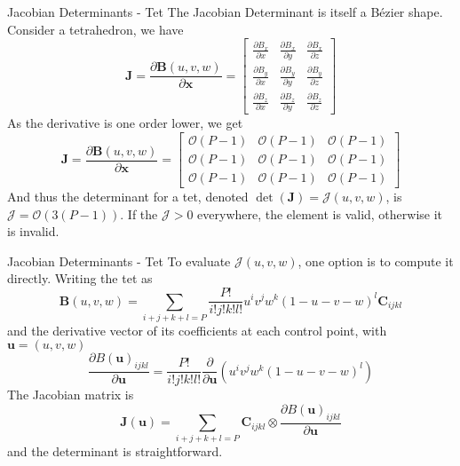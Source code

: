 \documentclass[12pt]{beamer}
\begin{document}
\begin{frame}{Jacobian Determinants - Tet}
The Jacobian Determinant is itself a B{\'e}zier shape. Consider a tetrahedron, we have
\[
\mathbf{J} = \frac{\partial \mathbf{B}(u,v,w)}{\partial \mathbf{x}} = 
\left[\begin{array}{ccc} \frac{\partial B_x}{\partial x} & \frac{\partial B_x}{\partial y} & \frac{\partial B_x}{\partial z} \\
\frac{\partial B_y}{\partial x} & \frac{\partial B_y}{\partial y} & \frac{\partial B_y}{\partial z} \\
\frac{\partial B_z}{\partial x} & \frac{\partial B_z}{\partial y} & \frac{\partial B_z}{\partial z} \end{array} \right]
\]
As the derivative is one order lower, we get
\[
\mathbf{J} = \frac{\partial \mathbf{B}(u,v,w)}{\partial \mathbf{x}} = 
\left[\begin{array}{ccc} \mathcal{O}(P-1) & \mathcal{O}(P-1) & \mathcal{O}(P-1) \\ \mathcal{O}(P-1) & \mathcal{O}(P-1) & \mathcal{O}(P-1) \\ \mathcal{O}(P-1) & \mathcal{O}(P-1) & \mathcal{O}(P-1)\end{array} \right]
\]
And thus the determinant for a tet, denoted $\det(\mathbf{J}) = \mathcal{J}(u,v,w)$, is $\mathcal{J} = \mathcal{O}(3(P-1))$. If the $\mathcal{J} > 0$ everywhere, the element is valid, otherwise it is invalid.
\end{frame}
\begin{frame}{Jacobian Determinants - Tet}
To evaluate $\mathcal{J}(u,v,w)$, one option is to compute it directly. Writing the tet as
 \[ \mathbf{B}(u,v,w) = \displaystyle\sum_{i+j+k+l=P} \frac{P!}{i!j!k!l!}u^iv^jw^k(1-u-v-w)^l\mathbf{C}_{ijkl} \]
 and the derivative vector of its coefficients at each control point, with $\mathbf{u} = (u,v,w)$
  \[ \frac{\partial B(\mathbf{u})_{ijkl}}{\partial \mathbf{u}} =\frac{P!}{i!j!k!l!} \frac{\partial}{\partial \mathbf{u}}\left( u^iv^jw^k(1-u-v-w)^l\right) \]
The Jacobian matrix is
\[\mathbf{J}(\mathbf{u}) = \displaystyle\sum_{i+j+k+l=P}\mathbf{C}_{ijkl} \otimes \frac{\partial B(\mathbf{u})_{ijkl}}{\partial \mathbf{u}} \]
and the determinant is straightforward.
\end{frame}
\end{document}
